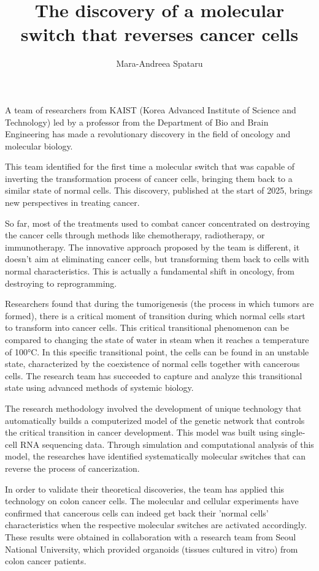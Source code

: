 \documentclass[12pt,a4paper]{article}
\title{The discovery of a molecular switch that reverses cancer cells}
\author{Mara-Andreea Spataru}
\date{}
\begin{document}
	
	\maketitle
	
	A team of researchers from KAIST (Korea Advanced Institute of Science and Technology) led by a professor from the Department of Bio and Brain Engineering has made a revolutionary discovery in the field of oncology and molecular biology. 
	
	This team identified for the first time a molecular switch that was capable of inverting the transformation process of cancer cells, bringing them back to a similar state of normal cells. This discovery, published at the start of 2025, brings new perspectives in treating cancer. 
	
	So far, most of the treatments used to combat cancer concentrated on destroying the cancer cells through methods like chemotherapy, radiotherapy, or immunotherapy. The innovative approach proposed by the team is different, it doesn't aim at eliminating cancer cells, but transforming them back to cells with normal characteristics. This is actually a fundamental shift in oncology, from destroying to reprogramming.
	
	Researchers found that during the tumorigenesis (the process in which tumors are formed), there is a critical moment of transition during which normal cells start to transform into cancer cells. This critical transitional phenomenon can be compared to changing the state of water in steam when it reaches a temperature of 100°C. In this specific transitional point, the cells can be found in an unstable state, characterized by the coexistence of normal cells together with cancerous cells. The research team has succeeded to capture and analyze this transitional state using advanced methods of systemic biology.
	
	The research methodology involved the development of unique technology that automatically builds a computerized model of the genetic network that controls the critical transition in cancer development. This model was built using single-cell RNA sequencing data. Through simulation and computational analysis of this model, the researches have identified systematically molecular switches that can reverse the process of cancerization. 
	
	In order to validate their theoretical discoveries, the team has applied this technology on colon cancer cells. The molecular and cellular experiments have confirmed that cancerous cells can indeed get back their 'normal cells' characteristics when the respective molecular switches are activated accordingly. These results were obtained in collaboration with a research team from Seoul National University, which provided organoids (tissues cultured in vitro) from colon cancer patients. 
	
\end{document}
